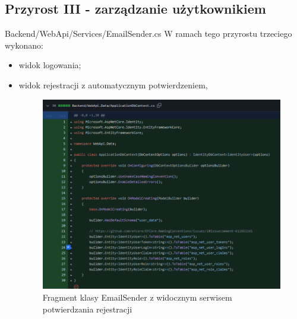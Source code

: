     \subsection{Przyrost III - zarządzanie użytkownikiem}
    \label{sec:przyrost3}
    Backend/WebApi/Services/EmailSender.cs
    W ramach tego przyrostu trzeciego wykonano:
    \begin{itemize}
        \item widok logowania;
        \item widok rejestracji z automatycznym potwierdzeniem,
        \begin{figure}[H]
            \centering
            \includegraphics[width=1\textwidth]{attachments/emailsender}
            \caption{Fragment klasy EmailSender z widocznym serwisem potwierdzania rejestracji}
            \label{fig:figure}
            \end{figure}


\end{itemize}
